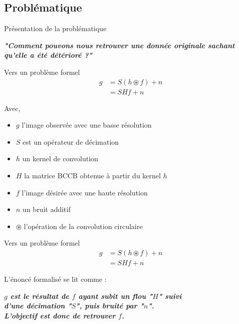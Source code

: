 \subsection{Problématique}

\frame{
    \tableofcontents[ 
        currentsubsection, 
    ]
}


\begin{frame}{Présentation de la problématique}
\begin{center}
\textbf{
    \emph{
        "Comment pouvons nous retrouver une donnée originale sachant \\
        qu'elle a été détérioré ?"
    }
}
\end{center} 
\end{frame}

\begin{frame}{Vers un problème formel}
\begin{align*}
g &= S(h \circledast f) + n \\
&= S H f + n
\end{align*}

Avec, \begin{itemize}
\item $g$ l'image observée avec une basse résolution
\item $S$ est un opérateur de décimation
\item $h$ un kernel de convolution 
\item $H$ la matrice BCCB obtenue à partir du kernel $h$
\item $f$ l'image désirée avec une haute résolution
\item $n$ un bruit additif
\item $\circledast$ l'opération de la convolution circulaire \\
\end{itemize}
\end{frame}


\begin{frame}{Vers un problème formel}
\begin{align*}
g &= S(h \circledast f) + n \\
&= S H f + n
\end{align*}

L'énoncé formalisé se lit comme : \\
\begin{center}
\textbf{
    \emph{
        $g$ est le résultat de $f$ ayant subit un flou "$H$" suivi \\
        d'une décimation "$S$", puis bruité par "$n$". \\
        L'objectif est donc de retrouver $f$. \\
    }
}
\end{center} 
\end{frame}


